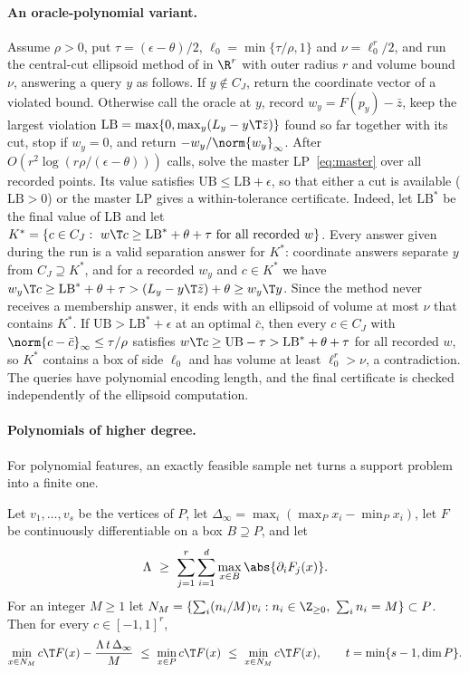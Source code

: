 \paragraph{An oracle-polynomial variant.}
Assume $\rho>0$, put $\tau=(\epsilon-\theta)/2$, $\ell_0=\min\{\tau/\rho,1\}$ and
$\nu=\ell_0^r/2$, and run the central-cut ellipsoid method of
\citet[Theorem~3.2.1]{GrotschelLovaszSchrijver1988} in $\R^r$ with outer radius
$r$ and volume bound $\nu$, answering a query $y$ as follows. If $y\notin C_J$,
return the coordinate vector of a violated bound. Otherwise call the oracle at
$y$, record $w_y=F(p_y)-\bar z$, keep the largest violation
$\mathrm{LB}=\max\{0,\max_y(L_y-y\T\bar z)\}$ found so far together with its cut,
stop if $w_y=0$, and return $-w_y/\norm{w_y}_\infty$. After
$O(r^2\log(r\rho/(\epsilon-\theta)))$ calls, solve the master LP~\eqref{eq:master}
over all recorded points. Its value satisfies $\mathrm{UB}\le\mathrm{LB}+\epsilon$,
so that either a cut is available ($\mathrm{LB}>0$) or the master LP gives a
within-tolerance certificate. Indeed, let $\mathrm{LB}^\ast$ be the final value
of LB and let
$K^\ast=\{c\in C_J:\ w\T c\ge\mathrm{LB}^\ast+\theta+\tau\ \text{for all recorded }w\}$.
Every answer given during the run is a valid separation answer for $K^\ast$:
coordinate answers separate $y$ from $C_J\supseteq K^\ast$, and for a recorded
$w_y$ and $c\in K^\ast$ we have
$w_y\T c\ge\mathrm{LB}^\ast+\theta+\tau>(L_y-y\T\bar z)+\theta\ge w_y\T y$. Since the
method never receives a membership answer, it ends with an ellipsoid of
volume at most $\nu$ that contains $K^\ast$. If $\mathrm{UB}>\mathrm{LB}^\ast+\epsilon$
at an optimal $\bar c$, then every $c\in C_J$ with $\norm{c-\bar c}_\infty\le\tau/\rho$
satisfies $w\T c\ge\mathrm{UB}-\tau>\mathrm{LB}^\ast+\theta+\tau$ for all recorded $w$,
so $K^\ast$ contains a box of side $\ell_0$ and has volume at least $\ell_0^r>\nu$, a
contradiction. The queries have polynomial encoding length, and the final
certificate is checked independently of the ellipsoid computation.

\paragraph{Polynomials of higher degree.}
For polynomial features, an exactly feasible sample net turns a support
problem into a finite one.

\begin{lemma}\label{lem:net}
Let $v_1,\dots,v_s$ be the vertices of $P$, let
$\Delta_\infty=\max_i(\max_Px_i-\min_Px_i)$, let $F$ be continuously
differentiable on a box $B\supseteq P$, and let
\[
\Lambda\ \ge\ \sum_{j=1}^r\sum_{i=1}^d\max_{x\in B}\abs{\partial_iF_j(x)}.
\]
For an integer $M\ge1$ let
$N_M=\{\sum_i(n_i/M)v_i:n_i\in\Z_{\ge0},\ \sum_in_i=M\}\subset P$. Then for every
$c\in[-1,1]^r$,
\[
\min_{x\in N_M}c\T F(x)-\frac{\Lambda\,t\,\Delta_\infty}M\ \le\ \min_{x\in P}c\T F(x)\ \le\ \min_{x\in N_M}c\T F(x),
\qquad t=\min\{s-1,\dim P\}.
\]
\end{lemma}

